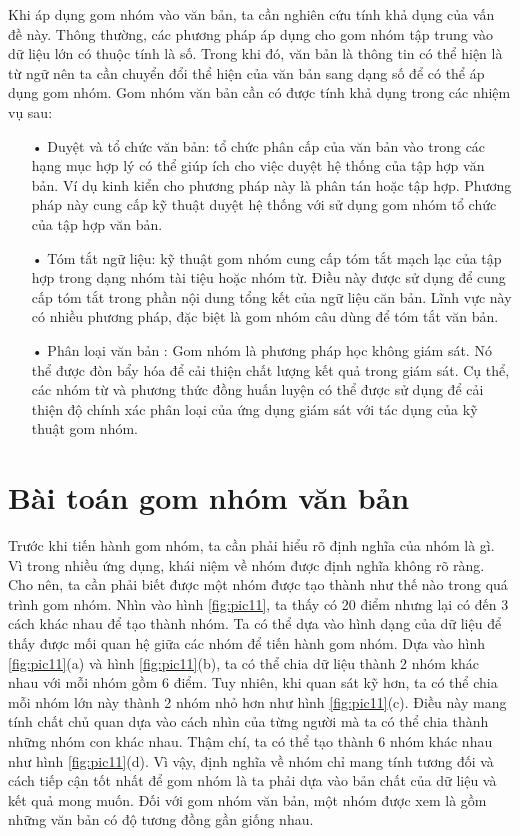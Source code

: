 Khi áp dụng gom nhóm vào văn bản, ta cần nghiên cứu tính khả dụng của vấn đề này.
Thông thường, các phương pháp áp dụng cho gom nhóm tập trung vào dữ liệu lớn có thuộc tính là số.
Trong khi đó, văn bản là thông tin có thể hiện là từ ngữ nên ta cần chuyển đổi thể hiện của văn bản sang dạng số để có thể áp dụng gom nhóm.
Gom nhóm văn bản cần có được tính khả dụng trong các nhiệm vụ sau:
\begin{enumerate}
\item[•]Duyệt và tổ chức văn bản: tổ chức phân cấp của văn bản vào trong các hạng mục hợp lý có thể giúp ích cho việc duyệt hệ thống của tập hợp văn bản. Ví dụ kinh kiển cho phương pháp này là phân tán hoặc tập hợp. Phương pháp này cung cấp kỹ thuật duyệt hệ thống với sử dụng gom nhóm tổ chức của tập hợp văn bản.
\item[•]Tóm tắt ngữ liệu: kỹ thuật gom nhóm cung cấp tóm tắt mạch lạc của tập hợp trong dạng nhóm tài tiệu hoặc nhóm từ. Điều này được sử dụng để cung cấp tóm tắt trong phần nội dung tổng kết của ngữ liệu căn bản. Lĩnh vực này có nhiều phương pháp, đặc biệt là gom nhóm câu dùng để tóm tắt văn bản.
\item[•]Phân loại văn bản : Gom nhóm là phương pháp học không giám sát. Nó thể được đòn bẩy hóa để cải thiện chất lượng kết quả trong giám sát. Cụ thể, các nhóm từ và phương thức đồng huấn luyện có thể được sử dụng để cải thiện độ chính xác phân loại của ứng dụng giám sát với tác dụng của kỹ thuật gom nhóm.
\end{enumerate}

\section{Bài toán gom nhóm văn bản}
Trước khi tiến hành gom nhóm, ta cần phải hiểu rõ định nghĩa của nhóm là gì.
Vì trong nhiều ứng dụng, khái niệm về nhóm được định nghĩa không rõ ràng.
Cho nên, ta cần phải biết được một nhóm được tạo thành như thế nào trong quá trình gom nhóm.
Nhìn vào hình \ref{fig:pic11}, ta thấy có 20 điểm nhưng lại có đến 3 cách khác nhau để tạo thành nhóm.
Ta có thể dựa vào hình dạng của dữ liệu để thấy được mối quan hệ giữa các nhóm để tiến hành gom nhóm.
Dựa vào hình \ref{fig:pic11}(a) và hình \ref{fig:pic11}(b), ta có thể chia dữ liệu thành 2 nhóm khác nhau với mỗi nhóm gồm 6 điểm.
Tuy nhiên, khi quan sát kỹ hơn, ta có thể chia mỗi nhóm lớn này thành 2 nhóm nhỏ hơn như hình \ref{fig:pic11}(c).
Điều này mang tính chất chủ quan dựa vào cách nhìn của từng người mà ta có thể chia thành những nhóm con khác nhau.
Thậm chí, ta có thể tạo thành 6 nhóm khác nhau như hình \ref{fig:pic11}(d).
Vì vậy, định nghĩa về nhóm chỉ mang tính tương đối và cách tiếp cận tốt nhất để gom nhóm là ta phải dựa vào bản chất của dữ liệu và kết quả mong muốn.
Đối với gom nhóm văn bản, một nhóm được xem là gồm những văn bản có độ tương đồng gần giống nhau.

